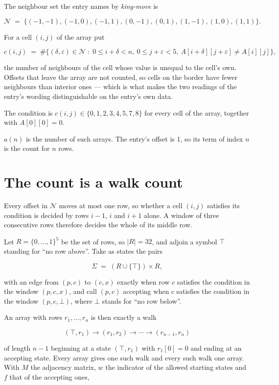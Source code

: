 \documentclass[11pt]{article}
\theoremstyle{definition}
\begin{document}
The neighbour set the entry names by {\itshape king-move} is

\[\mathcal{N} \;=\; \{(-1,-1), (-1,0), (-1,1), (0,-1), (0,1), (1,-1), (1,0), (1,1)\}.\]

For a cell $(i,j)$ of the array put

\[c(i,j) \;=\; \#\bigl\{(\delta,\varepsilon)\in\mathcal{N} \;:\; 0\le i+\delta<n,\ 0\le j+\varepsilon<5,\ A[i+\delta][j+\varepsilon] \neq A[i][j]\bigr\},\]

the number of neighbours of the cell whose value is unequal to the cell's own. Offsets that leave the array are not counted, so cells on the border have fewer neighbours than interior ones --- which is what makes the two readings of the entry's wording distinguishable on the entry's own data.

The condition is $c(i,j) \in \{0, 1, 2, 3, 4, 5, 7, 8\}$ for every cell of the array, together with $A[0][0]=0$.

$a(n)$ is the number of such arrays. The entry's offset is 1, so its term of index $n$ is the count for $n$ rows.

\section{The count is a walk count}

Every offset in $\mathcal{N}$ moves at most one row, so whether a cell $(i,j)$ satisfies its condition is decided by rows $i-1$, $i$ and $i+1$ alone. A window of three consecutive rows therefore decides the whole of its middle row.

Let $R = \{0,\dots,1\}^{5}$ be the set of rows, so $|R| = 32$, and adjoin a symbol $\top$ standing for ``no row above''. Take as states the pairs

\[\Sigma \;=\; (R \cup \{\top\}) \times R,\]

with an edge from $(p,c)$ to $(c,x)$ exactly when row $c$ satisfies the condition in the window $(p,c,x)$, and call $(p,c)$ accepting when $c$ satisfies the condition in the window $(p,c,\bot)$, where $\bot$ stands for ``no row below''.

An array with rows $r_1,\dots,r_n$ is then exactly a walk

\[(\top,r_1) \to (r_1,r_2) \to \cdots \to (r_{n-1},r_n)\]

of length $n-1$ beginning at a state $(\top,r_1)$ with $r_1[0]=0$ and ending at an accepting state. Every array gives one such walk and every such walk one array. With $M$ the adjacency matrix, $w$ the indicator of the allowed starting states and $f$ that of the accepting ones,
\end{document}

